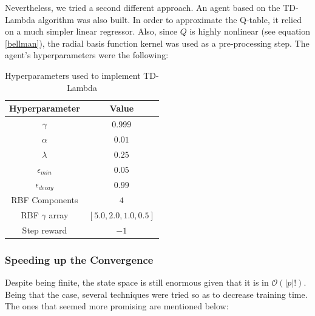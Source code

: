 \documentclass[11pt,twoside]{article}
\begin{document}
Nevertheless, we tried a second different approach. An agent based on the TD-Lambda algorithm was also built. In order to approximate the Q-table, it relied on a much simpler linear regressor. Also, since $Q$ is highly nonlinear (see equation \ref{bellman}), the radial basis function kernel was used as a pre-processing step. The agent's hyperparameters were the following:

\begin{table}[H]
	\begin{center}
		\begin{tabular}{|c |c|} 
			\hline
			Hyperparameter & Value \\
			\hline\hline
			$\gamma$ & $0.999$ \\
			$\alpha$ & $0.01$ \\
			$\lambda$ & $0.25$ \\
			$\epsilon_{min}$ & $0.05$ \\
			$\epsilon_{decay}$ & $0.99$ \\
			RBF Components & $4$ \\
			RBF $\gamma$ array & $[5.0, 2.0, 1.0, 0.5]$ \\
			Step reward & $-1$ \\
			\hline
		\end{tabular}
		\caption{Hyperparameters used to implement TD-Lambda}
	\end{center}
\end{table}

\subsubsection{Speeding up the Convergence}\label{speed_conv}

Despite being finite, the state space is still enormous given that it is in $\mathcal{O}(|p|!)$. Being that the case, several techniques were tried so as to decrease training time. The ones that seemed more promising are mentioned below:
\end{document}
